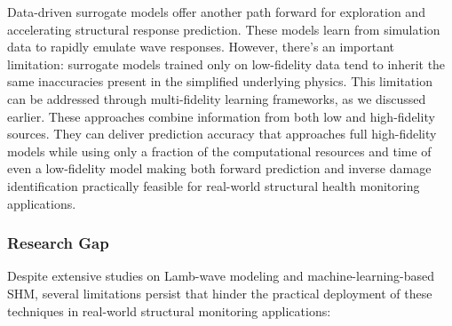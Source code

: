 \documentclass[12pt,a4paper]{report}
\begin{document}
Data-driven surrogate models offer another path forward for exploration and accelerating structural response prediction. These models learn from simulation data to rapidly emulate wave responses. However, there's an important limitation: surrogate models trained only on low-fidelity data tend to inherit the same inaccuracies present in the simplified underlying physics.
This limitation can be addressed through multi-fidelity learning frameworks, as we discussed earlier. These approaches combine information from both low and high-fidelity sources. They can deliver prediction accuracy that approaches full high-fidelity models while using only a fraction of the computational resources and time of even a low-fidelity model making both forward prediction and inverse damage identification practically feasible for real-world structural health monitoring applications.

\subsubsection{Research Gap}
Despite extensive studies on Lamb-wave modeling and machine-learning-based SHM, several limitations persist that hinder the practical deployment of these techniques in real-world structural monitoring applications:
\end{document}

